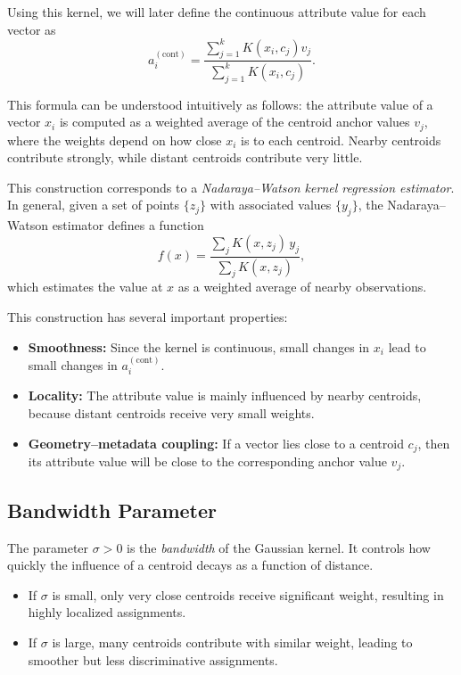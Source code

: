 Using this kernel, we will later define the continuous attribute value for each vector as
\[
a_i^{(\mathrm{cont})} =
\frac{\sum_{j=1}^k K(x_i, c_j) v_j}{\sum_{j=1}^k K(x_i, c_j)}.
\]

This formula can be understood intuitively as follows: the attribute value of a vector $x_i$ is computed as a weighted average of the centroid anchor values $v_j$, where the weights depend on how close $x_i$ is to each centroid. Nearby centroids contribute strongly, while distant centroids contribute very little.

\medskip

This construction corresponds to a \emph{Nadaraya--Watson kernel regression estimator}. In general, given a set of points $\{z_j\}$ with associated values $\{y_j\}$, the Nadaraya--Watson estimator defines a function
\[
f(x) = \frac{\sum_j K(x, z_j)\, y_j}{\sum_j K(x, z_j)},
\]
which estimates the value at $x$ as a weighted average of nearby observations.

This construction has several important properties:

\begin{itemize}
    \item \textbf{Smoothness:} Since the kernel is continuous, small changes in $x_i$ lead to small changes in $a_i^{(\mathrm{cont})}$.
    
    \item \textbf{Locality:} The attribute value is mainly influenced by nearby centroids, because distant centroids receive very small weights.
    
    \item \textbf{Geometry--metadata coupling:} If a vector lies close to a centroid $c_j$, then its attribute value will be close to the corresponding anchor value $v_j$.
\end{itemize}

\subsection{Bandwidth Parameter}

The parameter $\sigma > 0$ is the \emph{bandwidth} of the Gaussian kernel. It controls how quickly the influence of a centroid decays as a function of distance.

\begin{itemize}
    \item If $\sigma$ is small, only very close centroids receive significant weight, resulting in highly localized assignments.
    \item If $\sigma$ is large, many centroids contribute with similar weight, leading to smoother but less discriminative assignments.
\end{itemize}

